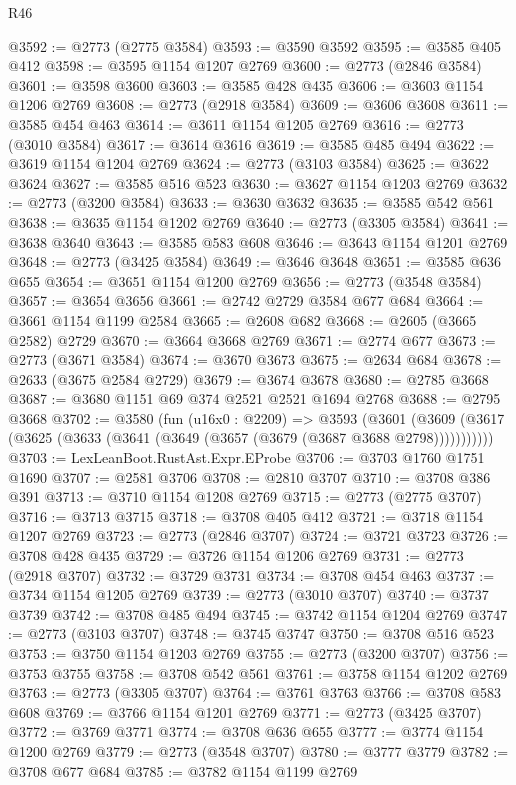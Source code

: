 \begin{lexlean}{R46}
\begin{coremodule}
@3592 := @2773 (@2775 @3584)
@3593 := @3590 @3592
@3595 := @3585 @405 @412
@3598 := @3595 @1154 @1207 @2769
@3600 := @2773 (@2846 @3584)
@3601 := @3598 @3600
@3603 := @3585 @428 @435
@3606 := @3603 @1154 @1206 @2769
@3608 := @2773 (@2918 @3584)
@3609 := @3606 @3608
@3611 := @3585 @454 @463
@3614 := @3611 @1154 @1205 @2769
@3616 := @2773 (@3010 @3584)
@3617 := @3614 @3616
@3619 := @3585 @485 @494
@3622 := @3619 @1154 @1204 @2769
@3624 := @2773 (@3103 @3584)
@3625 := @3622 @3624
@3627 := @3585 @516 @523
@3630 := @3627 @1154 @1203 @2769
@3632 := @2773 (@3200 @3584)
@3633 := @3630 @3632
@3635 := @3585 @542 @561
@3638 := @3635 @1154 @1202 @2769
@3640 := @2773 (@3305 @3584)
@3641 := @3638 @3640
@3643 := @3585 @583 @608
@3646 := @3643 @1154 @1201 @2769
@3648 := @2773 (@3425 @3584)
@3649 := @3646 @3648
@3651 := @3585 @636 @655
@3654 := @3651 @1154 @1200 @2769
@3656 := @2773 (@3548 @3584)
@3657 := @3654 @3656
@3661 := @2742 @2729 @3584 @677 @684
@3664 := @3661 @1154 @1199 @2584
@3665 := @2608 @682
@3668 := @2605 (@3665 @2582) @2729
@3670 := @3664 @3668 @2769
@3671 := @2774 @677
@3673 := @2773 (@3671 @3584)
@3674 := @3670 @3673
@3675 := @2634 @684
@3678 := @2633 (@3675 @2584 @2729)
@3679 := @3674 @3678
@3680 := @2785 @3668
@3687 := @3680 @1151 @69 @374 @2521 @2521 @1694 @2768
@3688 := @2795 @3668
@3702 := @3580
    (fun (u16x0 : @2209) =>
    @3593
      (@3601 (@3609 (@3617 (@3625 (@3633 (@3641 (@3649 (@3657 (@3679 (@3687 @3688 @2798)))))))))))
@3703 := LexLeanBoot.RustAst.Expr.EProbe
@3706 := @3703 @1760 @1751 @1690
@3707 := @2581 @3706
@3708 := @2810 @3707
@3710 := @3708 @386 @391
@3713 := @3710 @1154 @1208 @2769
@3715 := @2773 (@2775 @3707)
@3716 := @3713 @3715
@3718 := @3708 @405 @412
@3721 := @3718 @1154 @1207 @2769
@3723 := @2773 (@2846 @3707)
@3724 := @3721 @3723
@3726 := @3708 @428 @435
@3729 := @3726 @1154 @1206 @2769
@3731 := @2773 (@2918 @3707)
@3732 := @3729 @3731
@3734 := @3708 @454 @463
@3737 := @3734 @1154 @1205 @2769
@3739 := @2773 (@3010 @3707)
@3740 := @3737 @3739
@3742 := @3708 @485 @494
@3745 := @3742 @1154 @1204 @2769
@3747 := @2773 (@3103 @3707)
@3748 := @3745 @3747
@3750 := @3708 @516 @523
@3753 := @3750 @1154 @1203 @2769
@3755 := @2773 (@3200 @3707)
@3756 := @3753 @3755
@3758 := @3708 @542 @561
@3761 := @3758 @1154 @1202 @2769
@3763 := @2773 (@3305 @3707)
@3764 := @3761 @3763
@3766 := @3708 @583 @608
@3769 := @3766 @1154 @1201 @2769
@3771 := @2773 (@3425 @3707)
@3772 := @3769 @3771
@3774 := @3708 @636 @655
@3777 := @3774 @1154 @1200 @2769
@3779 := @2773 (@3548 @3707)
@3780 := @3777 @3779
@3782 := @3708 @677 @684
@3785 := @3782 @1154 @1199 @2769

\end{coremodule}
\end{lexlean}
